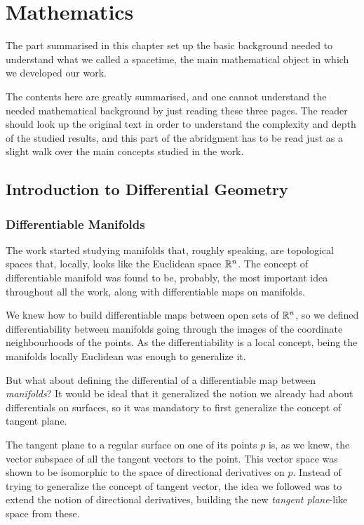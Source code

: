 \chapter{Mathematics}
\label{chapter:mathematicss}

The part summarised in this chapter set up the basic background needed to understand what we called a spacetime, the main mathematical object in which we developed our work.

The contents here are greatly summarised, and one cannot understand the needed mathematical background by just reading these three pages. The reader should look up the original text in order to understand the complexity and depth of the studied results, and this part of the abridgment has to be read just as a slight walk over the main concepts studied in the work.

\section{Introduction to Differential Geometry}
\label{chapter:diffgeom}

\subsection{Differentiable Manifolds}

The work started studying manifolds that, roughly speaking, are topological spaces that, locally, looks like the Euclidean space $\mathbb{R}^n$.	The concept of differentiable manifold was found to be, probably, the most important idea throughout all the work, along with differentiable maps on manifolds.

We knew how to build differentiable maps between open sets of $\mathbb{R}^n$, so we defined differentiability between manifolds going through the images of the coordinate neighbourhoods of the points. As the differentiability is a local concept, being the manifolds locally Euclidean was enough to generalize it.

But what about defining the differential of a differentiable map between \emph{manifolds}? It would be ideal that it generalized the notion we already had about differentials on surfaces, so it was mandatory to first generalize the concept of tangent plane.

The tangent plane to a regular surface on one of its points $p$ is, as we knew, the vector subspace of all the tangent vectors to the point. This vector space was shown to be isomorphic to the space of directional derivatives on $p$. Instead of trying to generalize the concept of tangent vector, the idea we followed was to extend the notion of directional derivatives, building the new \emph{tangent plane}-like space from these.

